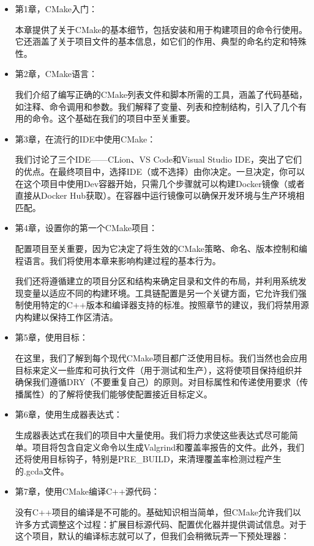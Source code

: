 \begin{itemize}
\item
第1章，CMake入门：

本章提供了关于CMake的基本细节，包括安装和用于构建项目的命令行使用。它还涵盖了关于项目文件的基本信息，如它们的作用、典型的命名约定和特殊性。

\item
第2章，CMake语言：

我们介绍了编写正确的CMake列表文件和脚本所需的工具，涵盖了代码基础，如注释、命令调用和参数。我们解释了变量、列表和控制结构，引入了几个有用的命令。这个基础在我们的项目中至关重要。

\item
第3章，在流行的IDE中使用CMake：

我们讨论了三个IDE——CLion、VS Code和Visual Studio IDE，突出了它们的优点。在最终项目中，选择IDE（或不选择）由你决定。一旦决定，你可以在这个项目中使用Dev容器开始，只需几个步骤就可以构建Docker镜像（或者直接从Docker Hub获取）。在容器中运行镜像可以确保开发环境与生产环境相匹配。

\item
第4章，设置你的第一个CMake项目：

配置项目至关重要，因为它决定了将生效的CMake策略、命名、版本控制和编程语言。我们将使用本章来影响构建过程的基本行为。

我们还将遵循建立的项目分区和结构来确定目录和文件的布局，并利用系统发现变量以适应不同的构建环境。工具链配置是另一个关键方面，它允许我们强制使用特定的C++版本和编译器支持的标准。按照章节的建议，我们将禁用源内构建以保持工作区清洁。

\item
第5章，使用目标：

在这里，我们了解到每个现代CMake项目都广泛使用目标。我们当然也会应用目标来定义一些库和可执行文件（用于测试和生产），这将使项目保持组织并确保我们遵循DRY（不要重复自己）的原则。对目标属性和传递使用要求（传播属性）的了解将使我们能够使配置接近目标定义。

\item
第6章，使用生成器表达式：

生成器表达式在我们的项目中大量使用。我们将力求使这些表达式尽可能简单。项目将包含自定义命令以生成Valgrind和覆盖率报告的文件。此外，我们还将使用目标钩子，特别是PRE\_BUILD，来清理覆盖率检测过程产生的.gcda文件。

\item
第7章，使用CMake编译C++源代码：

没有C++项目的编译是不可能的。基础知识相当简单，但CMake允许我们以许多方式调整这个过程：扩展目标源代码、配置优化器并提供调试信息。对于这个项目，默认的编译标志就可以了，但我们会稍微玩弄一下预处理器：


\end{itemize}
